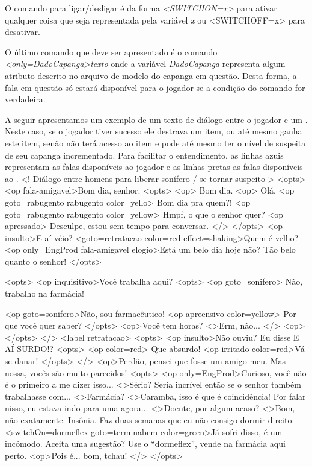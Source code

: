 O comando para ligar/desligar é da forma \emph{<SWITCHON=x>} para ativar qualquer coisa que seja representada pela variável \emph{x} ou {<SWITCHOFF=x>} para desativar.

O último comando que deve ser apresentado é o comando \emph{<only=DadoCapanga>texto} onde a variável \emph{DadoCapanga} representa algum atributo descrito no arquivo de modelo do capanga em questão. Desta forma, a fala em questão só estará disponível para o jogador se a condição do comando for verdadeira.

A seguir apresentamos um exemplo de um texto de diálogo entre o jogador e um \npc{}. Neste caso, se o jogador tiver sucesso ele destrava um item, ou até mesmo ganha este item, senão não terá acesso ao item e pode até mesmo ter o nível de suspeita de seu capanga incrementado.
Para facilitar o entendimento, as linhas azuis representam as falas disponíveis ao jogador e as linhas pretas as falas disponíveis ao \npc{}.
<! Diálogo entre homens para liberar sonífero / se tornar suspeito >
<opts>
	<op fala-amigavel>Bom dia, senhor.
<opts>
	<op> Bom dia.
		<op> Olá.
		 <op goto=rabugento rabugento color=yello> Bom dia pra quem?!
		<op goto=rabugento rabugento color=yellow> Hmpf, o que o senhor quer?
		<op apressado> Desculpe, estou sem tempo para conversar.
		</>
	</opts>
	<op insulto>E aí véio?
<goto=retratacao color=red effect=shaking>Quem é velho?
	<op only=EngProd  fala-amigavel elogio>Está um belo dia hoje não? Tão belo quanto o senhor!
</opts>

<opts>
<op inquisitivo>Você trabalha aqui?
	<opts>
		<op goto=sonifero> Não, trabalho na farmácia!
		
		<op goto=sonifero>Não, sou farmacêutico!
		<op apreensivo color=yellow> Por que você quer saber?
	</opts>
<op>Você tem horas?
<>Erm, não...
</>
<op>
</opts>
</>
<label retratacao>
<opts>
	<op insulto>Não ouviu? Eu disse E AÍ SURDO!?
	<opts>
<op color=red> Que absurdo!
	<op irritado color=red>Vá se danar!
</opts>
	</>
	<op>Perdão, pensei que fosse um amigo meu. Mas nossa, vocês são muito parecidos!
	<opts>
		<op only=EngProd>Curioso, você não é o primeiro a me dizer isso...
		<>Sério? Seria incrível então se o senhor também trabalhasse com...
		<>Farmácia?
		<>Caramba, isso é que é coincidência! Por falar nisso, eu estava indo para uma agora...
		<>Doente, por algum acaso?
		<>Bom, não exatamente. Insônia. Faz duas semanas que eu não consigo dormir direito.
		<switchOn=dormeflex goto=terminabem color=green>Já sofri disso, é um incômodo. Aceita uma sugestão? Use o  “dormeflex”, vende na farmácia aqui perto.
		<op>Pois é... bom, tchau!
</>
	</opts>

